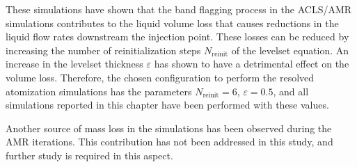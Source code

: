 These simulations have shown that the band flagging process in the ACLS/AMR simulations contributes to the liquid volume loss that causes reductions in the liquid flow rates downstream the injection point. These losses can be reduced by increasing the number of reinitialization steps $N_\mathrm{reinit}$ of the levelset equation. An increase in the levelset thickness $\varepsilon$ has shown to have a detrimental effect on the volume loss. Therefore, the chosen configuration to perform the resolved atomization simulations has the parameters $N_\mathrm{reinit} = 6$, $\varepsilon = 0.5$, and all simulations reported in this chapter have been performed with these values.

Another source of mass loss in the simulations has been observed during the AMR iterations. This contribution has not been addressed in this study, and further study is required in this aspect.


